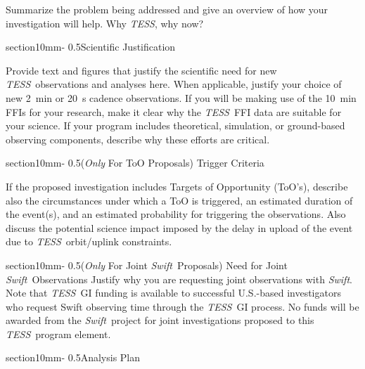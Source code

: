\documentclass[letterpaper,12pt]{article}
\makeatletter
\renewcommand{\section}{\@startsection%
{section}{1}{0mm}{-\baselineskip}%
{0.5\baselineskip}{\normalfont\Large\bfseries}}%
\newcommand{\tess}{{\it TESS}}
\newcommand{\swift}{{\it Swift}}
\makeatother
\begin{document}
Summarize the problem being addressed and give an overview of how your investigation will help. 
Why \tess, why now?

\section{Scientific Justification}

Provide text and figures that justify the scientific need for new \tess\ observations and analyses here. When applicable, justify your choice of new 2~min or 20~s cadence observations. 
If you will be making use of the 10~min FFIs for your research, make it clear why the \tess\ FFI data are suitable for your science.
If your program includes theoretical, simulation, or ground-based observing components, describe why these efforts are critical.


\section{({\it Only} For ToO Proposals) Trigger Criteria}

If the proposed investigation includes Targets of Opportunity (ToO's), describe also the circumstances 
under which a ToO is triggered, an estimated duration of the event(s), and an estimated probability for 
triggering the observations. Also discuss the potential science impact imposed by the delay in upload 
of the event due to \tess\ orbit/uplink constraints.


\section{({\it Only} For Joint \swift\ Proposals) Need for Joint \swift\ Observations}
Justify why you are requesting joint observations with \swift. \\

\noindent Note that \tess\ GI funding is available to successful U.S.-based investigators who request Swift observing time through the \tess\ GI process. No funds will be awarded from the \swift\ project for joint investigations proposed to this \tess\ program element. 

\section{Analysis Plan}
\end{document}
